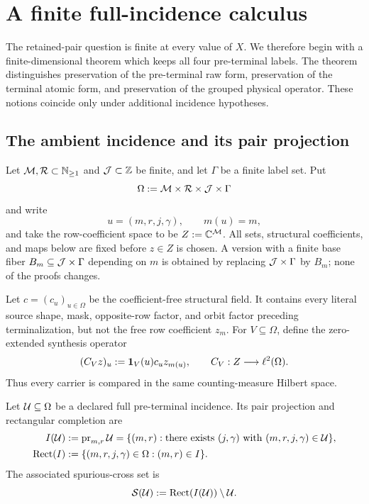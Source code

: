 \section{A finite full-incidence calculus}
\label{sec:incidence-calculus}

The retained-pair question is finite at every value of \(X\).  We therefore
begin with a finite-dimensional theorem which keeps all four pre-terminal
labels.  The theorem distinguishes preservation of the pre-terminal raw
form, preservation of the terminal atomic form, and preservation of the
grouped physical operator.  These notions coincide only under additional
incidence hypotheses.

\subsection{The ambient incidence and its pair projection}

Let \(\mathcal M,\mathcal R\subset\mathbb N_{\ge1}\) and \(\mathcal J\subset\mathbb Z\) be finite, and let
\(\Gamma\) be a finite label set.  Put
\begin{equation}
 \Omega:=\mathcal M\times\mathcal R\times\mathcal J\times\Gamma
 \label{eq:incidence-ambient-product}
\end{equation}
and write
\[
 u=(m,r,j,\gamma),\qquad m(u)=m,
\]
and take the row-coefficient space to be \(Z:=\mathbb C^{\mathcal M}\).  All sets,
structural coefficients, and maps below are fixed before \(z\in Z\) is
chosen.  A version with a finite base fiber
\(B_m\subseteq\mathcal J\times\Gamma\) depending on \(m\) is obtained by replacing
\(\mathcal J\times\Gamma\) by \(B_m\); none of the proofs changes.

Let \(c=(c_u)_{u\in\Omega}\) be the coefficient-free structural field.  It
contains every literal source shape, mask, opposite-row factor, and orbit
factor preceding terminalization, but not the free row coefficient \(z_m\).
For \(V\subseteq\Omega\), define the zero-extended synthesis operator
\begin{equation}
 (C_Vz)_u:=\mathbf 1_V(u)c_u z_{m(u)},
 \qquad C_V:Z\longrightarrow\ell^2(\Omega).
 \label{eq:incidence-CV}
\end{equation}
Thus every carrier is compared in the same counting-measure Hilbert space.

\begin{definition}
\label{def:incidence-full-pair-rectangle}
Let \(\mathcal U\subseteq\Omega\) be a declared full pre-terminal incidence.  Its
pair projection and rectangular completion are
\begin{align}
 I(\mathcal U)
 &:=\operatorname{pr}_{m,r}\mathcal U
   =\{(m,r):\text{there exists }(j,\gamma)
                    \text{ with }(m,r,j,\gamma)\in\mathcal U\},
 \label{eq:incidence-pair-projection}\\
 \operatorname{Rect}(I)
 &:=\{(m,r,j,\gamma)\in\Omega:(m,r)\in I\}.
 \label{eq:incidence-rectangular-completion}
\end{align}
The associated spurious-cross set is
\begin{equation}
 \mathcal S(\mathcal U):=\operatorname{Rect}(I(\mathcal U))\setminus\mathcal U.
 \label{eq:incidence-spurious-set}
\end{equation}
\end{definition}

